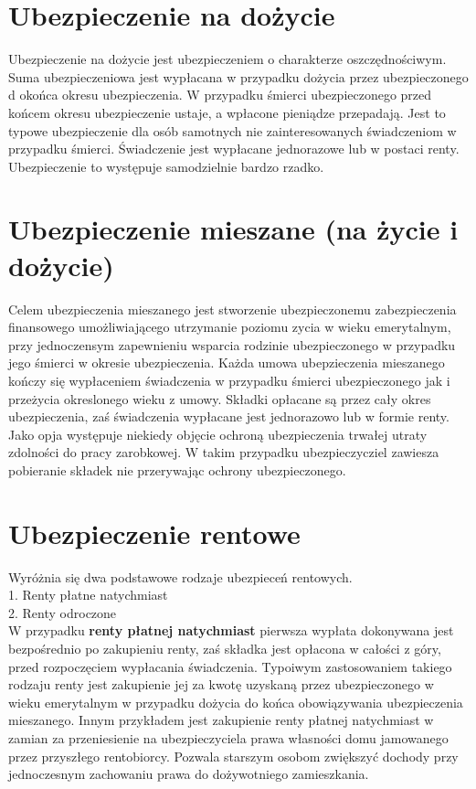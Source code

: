 \documentclass{article}
\begin{document}
\section{Ubezpieczenie na dożycie}

Ubezpieczenie na dożycie jest ubezpieczeniem o charakterze oszczędnościwym. Suma ubezpieczeniowa jest wypłacana w przypadku dożycia przez ubezpieczonego d okońca okresu ubezpieczenia. W przypadku śmierci ubezpieczonego przed końcem okresu ubezpieczenie ustaje, a wpłacone pieniądze przepadają. Jest to typowe ubezpieczenie dla osób samotnych nie zainteresowanych świadczeniom w przypadku śmierci. Świadczenie jest wypłacane jednorazowe lub w postaci renty. Ubezpieczenie to występuje samodzielnie bardzo rzadko.

\section{Ubezpieczenie mieszane (na życie i dożycie)}

Celem ubezpieczenia mieszanego jest stworzenie ubezpieczonemu zabezpieczenia finansowego umożliwiającego utrzymanie poziomu zycia w wieku emerytalnym, przy jednoczensym zapewnieniu wsparcia rodzinie ubezpieczonego w przypadku jego śmierci w okresie ubezpieczenia. Każda umowa ubepzieczenia mieszanego kończy się wypłaceniem świadczenia w przypadku śmierci ubezpieczonego jak i przeżycia okreslonego wieku z umowy. Składki opłacane są przez cały okres ubezpieczenia, zaś świadczenia wypłacane jest jednorazowo lub w formie renty. Jako opja występuje niekiedy objęcie ochroną ubezpieczenia trwałej utraty zdolności do pracy zarobkowej. W takim przypadku ubezpieczycziel zawiesza pobieranie składek nie przerywając ochrony ubezpieczonego.

\section{Ubezpieczenie rentowe}

Wyróżnia się dwa podstawowe rodzaje ubezpieceń rentowych.\\

1. Renty płatne natychmiast\\

2. Renty odroczone\\

W przypadku \textbf{renty płatnej natychmiast} pierwsza wypłata dokonywana jest bezpośrednio po zakupieniu renty, zaś składka jest opłacona w całości z góry, przed rozpoczęciem wypłacania świadczenia. Typoiwym zastosowaniem takiego rodzaju renty jest zakupienie jej za kwotę  uzyskaną przez ubezpieczonego w wieku emerytalnym w przypadku dożycia do końca obowiązywania ubezpieczenia mieszanego. Innym przykładem jest zakupienie renty płatnej natychmiast w zamian za przeniesienie na ubezpieczyciela prawa własności domu jamowanego przez przyszłego rentobiorcy. Pozwala starszym osobom zwiększyć dochody przy jednoczesnym zachowaniu prawa do dożywotniego zamieszkania.\\
\end{document}
